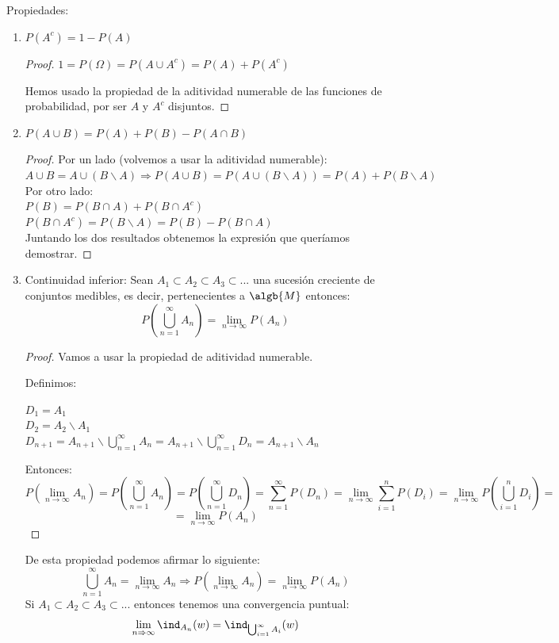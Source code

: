 \documentclass{apuntes}
\begin{document}
Propiedades:
\begin{enumerate}
\item $P(A^c) = 1-P(A)$
\begin{proof}
$1=P(\Omega)=P(A \cup A^c) = P(A) + P(A^c)$ 

Hemos usado la propiedad de la aditividad numerable de las funciones de probabilidad, por ser $A$ y $A^c$ disjuntos.
\end{proof} 
\item $P(A \cup B) = P(A) + P(B) - P(A \cap B)$
\begin{proof}

Por un lado (volvemos a usar la aditividad numerable):\\
$A \cup B = A \cup (B \backslash A) \Rightarrow P(A \cup B) = P(A \cup (B \backslash A)) = P(A) + P(B \backslash A)$\\

Por otro lado:\\
$P(B) = P(B \cap A) + P(B \cap A^c)$\\
$P(B \cap A^c) = P(B \backslash A) = P(B) - P(B \cap A)$ \\

Juntando los dos resultados obtenemos la expresión que queríamos demostrar.
\end{proof}

\item Continuidad inferior: Sean $A_1 \subset A_2 \subset A_3 \subset ...$ una sucesión creciente de conjuntos medibles, es decir, pertenecientes a $\algb{M}$ entonces:
\[ P(\bigcup_{n=1}^{\infty}A_n) = \lim_{n \rightarrow \infty} P(A_n)
\]


\begin{proof}
Vamos a usar la propiedad de aditividad numerable.

Definimos:

$D_1=A_1$\\
$D_2=A_2 \backslash A_1$\\
$D_{n+1}=A_{n+1} \backslash \bigcup_{n=1}^{\infty}A_n=A_{n+1} \backslash \bigcup_{n=1}^{\infty}D_n=A_{n+1} \backslash A_n$

Entonces: 
\[P(\lim_{n \rightarrow \infty}A_n)=P(\bigcup_{n=1}^{\infty}A_n)=P(\bigcup_{n=1}^{\infty}D_n)=\sum_{n=1}^{\infty}P(D_n)=\lim_{n \rightarrow \infty}\sum_{i=1}^{n}P(D_i)=\lim_{n \rightarrow \infty}P(\bigcup_{i=1}^{n}D_i) =
\]
\[
=\lim_{n \rightarrow \infty}P(A_n)
\]
\end{proof} 

\obs De esta propiedad podemos afirmar lo siguiente: \[ \bigcup_{n=1}^{\infty}A_n = \lim_{n \rightarrow \infty} A_n \Rightarrow P(\lim_{n \rightarrow \infty} A_n) = \lim_{n \rightarrow \infty} P(A_n)
\]
\obs Si $A_1 \subset A_2 \subset A_3 \subset...$ entonces tenemos una convergencia puntual:
\[
\lim_{n \Rightarrow \infty}\ind_{A_n}(w) = \ind_{\bigcup_{i=1}^{\infty}A_i}(w)
\]


\end{enumerate}
\end{document}
